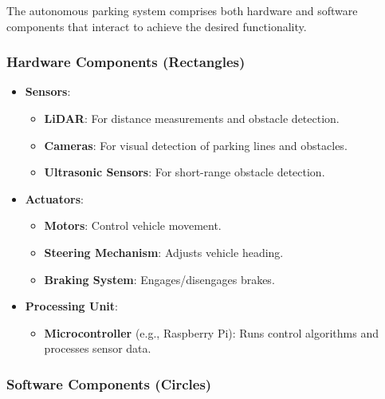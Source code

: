 \documentclass[12pt]{article}
\begin{document}
The autonomous parking system comprises both hardware and software components that interact to achieve the desired functionality.

\subsubsection{Hardware Components (Rectangles)}

\begin{itemize}
    \item \textbf{Sensors}:
    \begin{itemize}
        \item \textbf{LiDAR}: For distance measurements and obstacle detection.
        \item \textbf{Cameras}: For visual detection of parking lines and obstacles.
        \item \textbf{Ultrasonic Sensors}: For short-range obstacle detection.
    \end{itemize}
    \item \textbf{Actuators}:
    \begin{itemize}
        \item \textbf{Motors}: Control vehicle movement.
        \item \textbf{Steering Mechanism}: Adjusts vehicle heading.
        \item \textbf{Braking System}: Engages/disengages brakes.
    \end{itemize}
    \item \textbf{Processing Unit}:
    \begin{itemize}
        \item \textbf{Microcontroller} (e.g., Raspberry Pi): Runs control algorithms and processes sensor data.
    \end{itemize}
\end{itemize}

\subsubsection{Software Components (Circles)}
\end{document}
